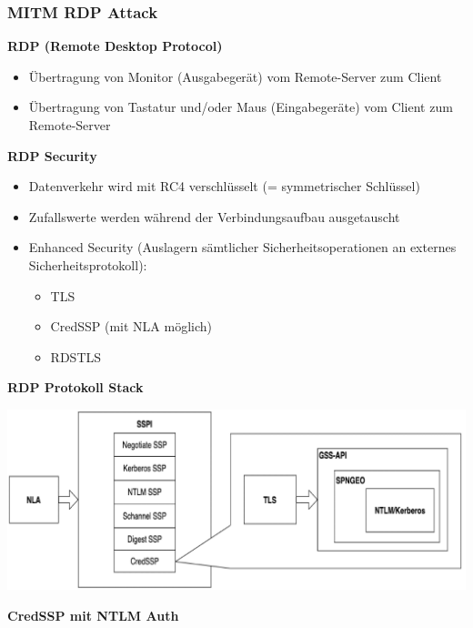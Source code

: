 \subsubsection{MITM RDP Attack}
\textbf{RDP (Remote Desktop Protocol)}
\begin{itemize}
    \item Übertragung von Monitor (Ausgabegerät) vom Remote-Server zum Client
    \item Übertragung von Tastatur und/oder Maus (Eingabegeräte) vom Client zum Remote-Server
\end{itemize}
\textbf{RDP Security}
\begin{itemize}
    \item Datenverkehr wird mit RC4 verschlüsselt (= symmetrischer Schlüssel)
    \item Zufallswerte werden während der Verbindungsaufbau ausgetauscht
    \item Enhanced Security (Auslagern sämtlicher Sicherheitsoperationen an externes Sicherheitsprotokoll):
    \begin{itemize}
        \item TLS
        \item CredSSP (mit NLA möglich)
        \item RDSTLS
    \end{itemize}
\end{itemize}
\textbf{RDP Protokoll Stack}
\begin{center}
    \vspace{-8pt}
    \includegraphics[width=1.0\linewidth]{./img/09-mitm/rdp_proto}
    \vspace{-8pt}
\end{center}
\textbf{CredSSP mit NTLM Auth}

